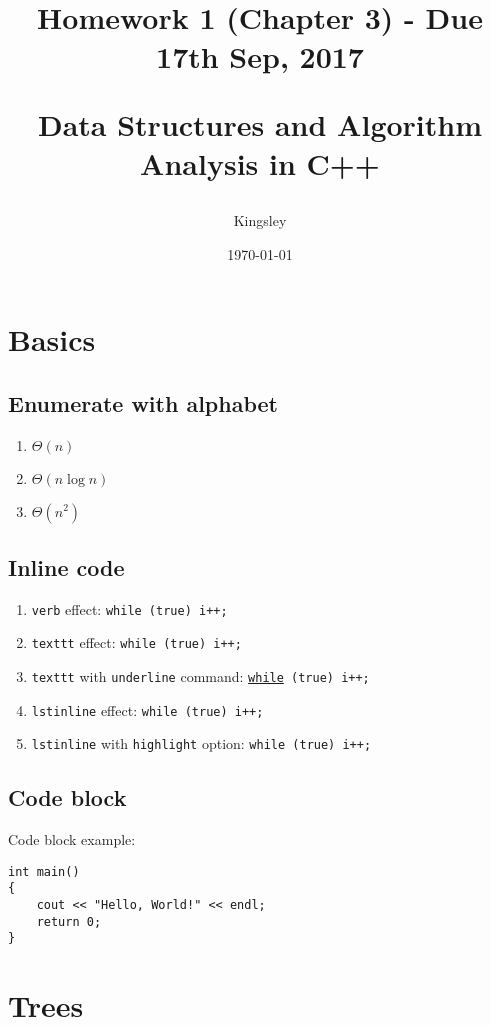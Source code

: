 \documentclass[titlepage]{article}
\title{
Homework 1 (Chapter 3) - Due 17th Sep, 2017\\
\begin{large}
Data Structures and Algorithm Analysis in C++
\end{large}
}
\author{Kingsley}
\date{\today}
\begin{document}
\maketitle

\hypersetup{pageanchor=false}
\clearpage
\tableofcontents
\clearpage
\hypersetup{pageanchor=true}

\section{Basics}
\subsection{Enumerate with alphabet}
\begin{enumerate}[label=(\alph*)]
\item $\Theta(n)$
\item $\Theta(n\log n)$
\item $\Theta(n^2)$
\end{enumerate}

\subsection{Inline code}
\begin{enumerate}
\item \verb|verb| effect: \verb|while (true) i++;|
\item \verb|texttt| effect: \texttt{while (true) i++;}
\item \verb|texttt| with \verb|underline| command: \texttt{\underline{while} (true) i++;}
\item \verb|lstinline| effect: \lstinline[style=monospaced]{while (true) i++;}
\item \verb|lstinline| with \verb|highlight| option: \lstinline[style=cpp-orange-hl]{while (true) i++;}
\end{enumerate}

\subsection{Code block}
Code block example:
\begin{lstlisting}[style=monospaced]
int main()
{
	cout << "Hello, World!" << endl;
	return 0;
}
\end{lstlisting}

\section{Trees}
\end{document}
